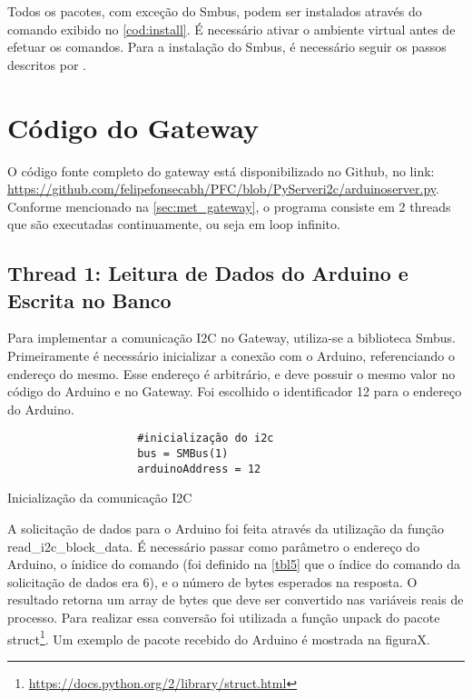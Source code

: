 			Todos os pacotes, com exceção do Smbus, podem ser instalados através do comando exibido no \autoref{cod:install}. É necessário ativar o ambiente virtual antes de efetuar os comandos. Para a instalação do Smbus, é necessário seguir os passos descritos por \textcite{dipto2015}. 
			
		
		
		\section{Código do Gateway}
			O código fonte completo do gateway está disponibilizado no Github, no link: \url{https://github.com/felipefonsecabh/PFC/blob/PyServeri2c/arduinoserver.py}. Conforme mencionado na \autoref{sec:met_gateway}, o programa consiste em 2 threads que são executadas continuamente, ou seja em loop infinito.
			
			\subsection{Thread 1: Leitura de Dados do Arduino e Escrita no Banco}
				Para implementar a comunicação I2C no Gateway, utiliza-se a biblioteca Smbus. Primeiramente é necessário inicializar a conexão com o Arduino, referenciando o endereço do mesmo. Esse endereço é arbitrário, e deve possuir o mesmo valor no código do Arduino e no Gateway. Foi escolhido o identificador 12 para o endereço do Arduino.
				
				\begin{listing}[!htb]
					\begin{verbatim}
					#inicialização do i2c
					bus = SMBus(1)
					arduinoAddress = 12				
					\end{verbatim}
					\caption{Inicialização da comunicação I2C}
					\label{cod:starti2c}
				\end{listing}
				
				A solicitação de dados para o Arduino foi feita através da utilização da função read\_i2c\_block\_data. É necessário passar como parâmetro o endereço do Arduino, o ínidice do comando (foi definido na \autoref{tbl5} que o índice do comando da solicitação de dados era 6), e o número de bytes esperados na resposta. O resultado retorna um array de bytes que deve ser convertido nas variáveis reais de processo. Para realizar essa conversão foi utilizada a função unpack do pacote struct\footnote{\url{https://docs.python.org/2/library/struct.html}}. Um exemplo de pacote recebido do Arduino é mostrada na figuraX.
				

